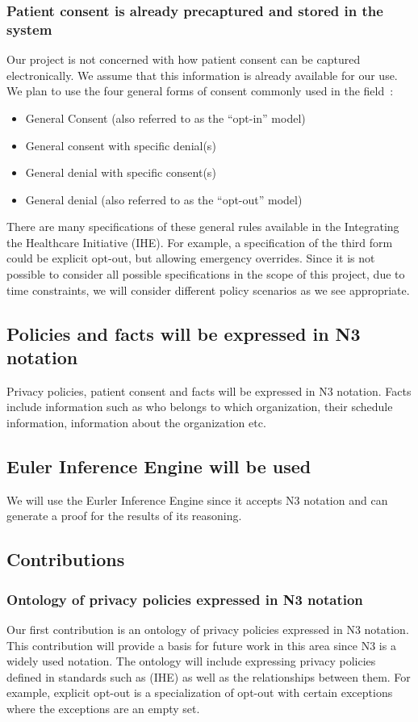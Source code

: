 \documentclass[conference]{IEEEtran}
\begin{document}
\subsubsection{Patient consent is already precaptured and stored in the system}
Our project is not concerned with how patient consent can be captured electronically. We assume that this information is already available for our use. We plan to use the four general forms of consent commonly used in the field~\cite{coiera2004consent}:
\begin{itemize}
    \item General Consent (also referred to as the ``opt-in'' model)
\item General consent with specific denial(s)
\item General denial with specific consent(s)
\item General denial (also referred to as the ``opt-out'' model)
\end{itemize}

There are many specifications of these general rules available in the Integrating the Healthcare Initiative (IHE). For example, a specification of the third form could be explicit opt-out, but allowing emergency overrides. Since it is not possible to consider all possible specifications in the scope of this project, due to time constraints, we will consider different policy scenarios as we see appropriate. 

\subsection{Policies and facts will be expressed in N3 notation}
Privacy policies, patient consent and facts will be expressed in N3 notation. Facts include information such as who belongs to which organization, their schedule information, information about the organization etc. 

\subsection{Euler Inference Engine will be used}
We will use the Eurler Inference Engine since it accepts N3 notation and can generate a proof for the results of its reasoning.


\subsection{Contributions}

\subsubsection{Ontology of privacy policies expressed in N3 notation}
Our first contribution is an ontology of privacy policies expressed in N3 notation. This contribution will provide a basis for future work in this area since N3 is a widely used notation. The ontology will include expressing privacy policies defined in standards such as (IHE) as well as the relationships between them. For example, explicit opt-out is a specialization of opt-out with certain exceptions where the exceptions are an empty set. 
\end{document}
